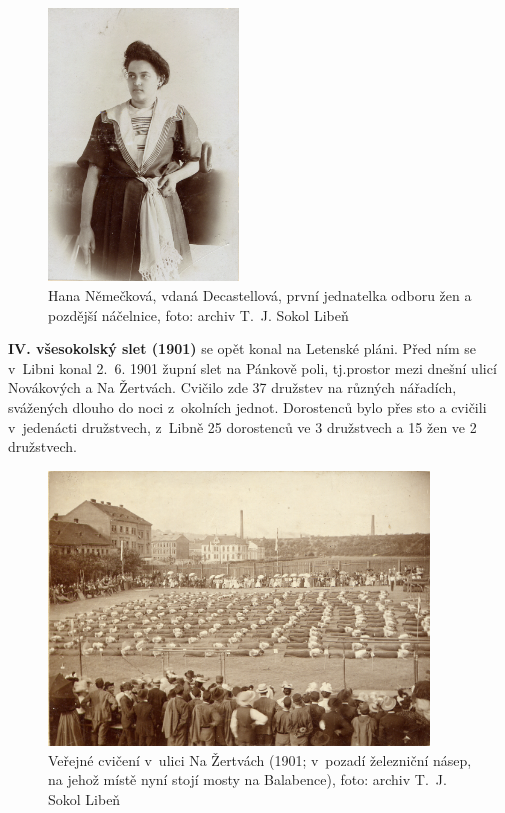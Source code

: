 \documentclass[a5paper, 11pt, twoside]{article}
\begin{document}
\begin{figure}[h!]
  \centering
  \includegraphics[width=0.45\textwidth]{img/11_hana_decastellova.jpg}
  \caption*{Hana Němečková, vdaná Decastellová, první jednatelka odboru žen a pozdější náčelnice, foto: archiv T.~J. Sokol Libeň}
\end{figure}

\textbf{IV. všesokolský slet (1901)} se opět konal na Letenské pláni. Před ním se v~Libni konal 2.~6. 1901 župní slet na Pánkově poli, tj.prostor mezi dnešní ulicí Novákových a Na Žertvách. Cvičilo zde 37 družstev na různých nářadích, svážených dlouho do noci z~okolních jednot. Dorostenců bylo přes sto a cvičili v~jedenácti družstvech, z~Libně 25 dorostenců ve 3 družstvech a 15 žen ve 2 družstvech.

\begin{figure}[hp]
  \centering
  \includegraphics[width=0.9\textwidth]{img/12_na_zertvach.jpg}
  \caption*{Veřejné cvičení v~ulici Na Žertvách (1901; v~pozadí železniční násep, na jehož místě nyní stojí mosty na Balabence), foto: archiv T.~J. Sokol Libeň}
\end{figure}
\end{document}
